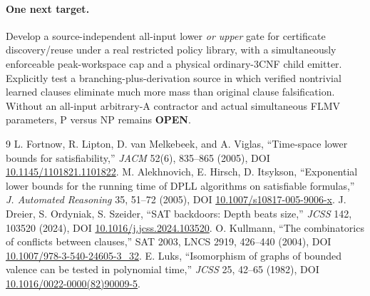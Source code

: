 \documentclass[10pt]{article}
\newcommand{\OPEN}{\textbf{OPEN}}
\begin{document}
\paragraph{One next target.} Develop a source-independent all-input lower \emph{or upper} gate for certificate discovery/reuse under a real restricted policy library, with a simultaneously enforceable peak-workspace cap and a physical ordinary-3CNF child emitter. Explicitly test a branching-plus-derivation source in which verified nontrivial learned clauses eliminate much more mass than original clause falsification. Without an all-input arbitrary-A contractor and actual simultaneous FLMV parameters, P versus NP remains \OPEN.

\begin{thebibliography}{9}
 L. Fortnow, R. Lipton, D. van Melkebeek, and A. Viglas, ``Time-space lower bounds for satisfiability,'' \emph{JACM} 52(6), 835--865 (2005), DOI \href{https://doi.org/10.1145/1101821.1101822}{10.1145/1101821.1101822}.
 M. Alekhnovich, E. Hirsch, D. Itsykson, ``Exponential lower bounds for the running time of DPLL algorithms on satisfiable formulas,'' \emph{J. Automated Reasoning} 35, 51--72 (2005), DOI \href{https://doi.org/10.1007/s10817-005-9006-x}{10.1007/s10817-005-9006-x}.
 J. Dreier, S. Ordyniak, S. Szeider, ``SAT backdoors: Depth beats size,'' \emph{JCSS} 142, 103520 (2024), DOI \href{https://doi.org/10.1016/j.jcss.2024.103520}{10.1016/j.jcss.2024.103520}.
 O. Kullmann, ``The combinatorics of conflicts between clauses,'' SAT 2003, LNCS 2919, 426--440 (2004), DOI \href{https://doi.org/10.1007/978-3-540-24605-3_32}{10.1007/978-3-540-24605-3\_32}.
 E. Luks, ``Isomorphism of graphs of bounded valence can be tested in polynomial time,'' \emph{JCSS} 25, 42--65 (1982), DOI \href{https://doi.org/10.1016/0022-0000(82)90009-5}{10.1016/0022-0000(82)90009-5}.
\end{thebibliography}
\end{document}
